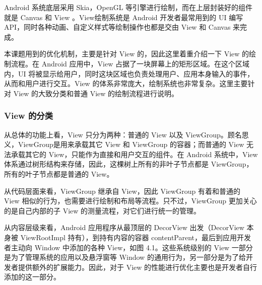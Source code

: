 Android 系统底层采用 Skia，OpenGL 等引擎进行绘制，而在上层封装好的组件就是 Canvas 和 View \cite{tahir2013learning}。View绘制系统是 Android 开发者最常用到的 UI 编写 API，同时各种动画、自定义样式等绘制操作也都是交由 View 和 Canvas 来完成。

本课题用到的优化机制，主要是针对 View 的，因此这里着重介绍一下 View 的绘制流程。在 Android 应用中，View 占据了一块屏幕上的矩形区域。在这个区域内，UI 将被显示给用户，同时这块区域也负责处理用户、应用本身输入的事件，从而和用户进行交互\cite{aljarrah2016maintaining}。View 的体系非常庞大，绘制系统也非常复杂。这里主要针对 View 的大致分类和普通 View 的绘制流程进行说明。

\subsubsection*{View 的分类}

从总体的功能上看，View 只分为两种：普通的 View 以及 ViewGroup。顾名思义，ViewGroup是用来承载其它 View 和 ViewGroup 的容器；而普通的 View 无法承载其它的 View，只能作为直接和用户交互的组件。在 Android 系统中，View 体系通过树形结构来存储，因此，这棵树上所有的非叶子节点都是 ViewGroup，所有的叶子节点都是普通的 View。

从代码层面来看，ViewGroup 继承自 View，因此 ViewGroup 有着和普通的 View 相似的行为，也需要进行绘制和布局等流程。只不过，ViewGroup 更加关心的是自己内部的子 View 的测量流程，对它们进行统一的管理。\

从内容层级来看，Android 应用程序从最顶层的 DecorView 出发（DecorView 本身被 ViewRootImpl 持有），到持有内容的容器 contentParent，最后到应用开发者主动向 Window 中添加的各种 View，如图 4.1。这些系统级别的 View 一部分是为了管理系统的应用以及悬浮窗等 Window 的通用行为，另一部分是为了给开发者提供额外的扩展能力。因此，对于 View 的性能进行优化主要也是开发者自行添加的这一部分。


